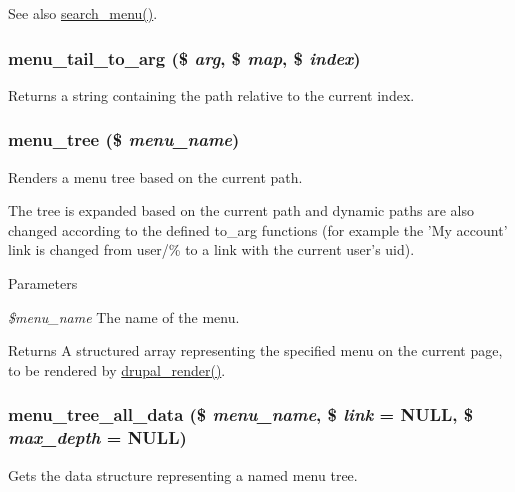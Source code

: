 \begin{DoxySeeAlso}{See also}
\hyperlink{search_8module_ac0cbdaa688ee15c024867c96b54a4036}{search\_\-menu()}. 
\end{DoxySeeAlso}
\hypertarget{group__menu_gaad6215c5bf31dffe08a2b75e66345d10}{
\subsubsection[{menu\_\-tail\_\-to\_\-arg}]{\setlength{\rightskip}{0pt plus 5cm}menu\_\-tail\_\-to\_\-arg (\$ {\em arg}, \/  \$ {\em map}, \/  \$ {\em index})}}
\label{group__menu_gaad6215c5bf31dffe08a2b75e66345d10}
Returns a string containing the path relative to the current index. \hypertarget{group__menu_ga91022785ee027528b5cee2faff31f62f}{
\subsubsection[{menu\_\-tree}]{\setlength{\rightskip}{0pt plus 5cm}menu\_\-tree (\$ {\em menu\_\-name})}}
\label{group__menu_ga91022785ee027528b5cee2faff31f62f}
Renders a menu tree based on the current path.

The tree is expanded based on the current path and dynamic paths are also changed according to the defined to\_\-arg functions (for example the 'My account' link is changed from user/\% to a link with the current user's uid).


\begin{DoxyParams}{Parameters}
\item[{\em \$menu\_\-name}]The name of the menu.\end{DoxyParams}
\begin{DoxyReturn}{Returns}
A structured array representing the specified menu on the current page, to be rendered by \hyperlink{common_8inc_a05798b44e8d6c496d4bee5cc32fa7851}{drupal\_\-render()}. 
\end{DoxyReturn}
\hypertarget{group__menu_ga4f06528e6ed613b6a885e051035b322a}{
\subsubsection[{menu\_\-tree\_\-all\_\-data}]{\setlength{\rightskip}{0pt plus 5cm}menu\_\-tree\_\-all\_\-data (\$ {\em menu\_\-name}, \/  \$ {\em link} = {\ttfamily NULL}, \/  \$ {\em max\_\-depth} = {\ttfamily NULL})}}
\label{group__menu_ga4f06528e6ed613b6a885e051035b322a}
Gets the data structure representing a named menu tree.

